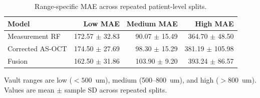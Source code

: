 \begin{table}[t]
\centering
\caption{Range-specific MAE across repeated patient-level splits.}
\label{tab:range_metrics}
\begin{tabular}{lrrr}
\toprule
Model & Low MAE & Medium MAE & High MAE \\
\midrule
Measurement RF & 172.57 $\pm$ 32.83 & 90.07 $\pm$ 15.49 & 364.70 $\pm$ 48.50 \\
Corrected AS-OCT & 174.50 $\pm$ 27.69 & 98.30 $\pm$ 15.29 & 381.19 $\pm$ 105.98 \\
Fusion & 162.50 $\pm$ 31.86 & 103.90 $\pm$ 9.20 & 393.24 $\pm$ 86.57 \\
\bottomrule
\end{tabular}
\footnotesize Vault ranges are low ($<500$~um), medium (500--800~um), and high ($>800$~um). Values are mean $\pm$ sample SD across repeated splits.
\end{table}
